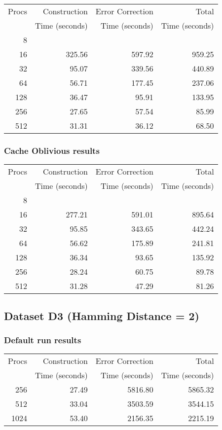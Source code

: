 \documentclass[integrals, nointegrals, article, 12pt, a4paper]{article}
\begin{document}
\begin{center}
\begin{tabular}{rrrr}
\hline
Procs & Construction & Error Correction & Total\\
 & Time (seconds) & Time (seconds) & Time (seconds)\\
\hline
8 &  &  & \\
16 & 325.56 & 597.92 & 959.25\\
32 & 95.07 & 339.56 & 440.89\\
64 & 56.71 & 177.45 & 237.06\\
128 & 36.47 & 95.91 & 133.95\\
256 & 27.65 & 57.54 & 85.99\\
512 & 31.31 & 36.12 & 68.50\\
\hline
\end{tabular}
\end{center}
\subsubsection{Cache Oblivious results}
\label{sec-2-4-3}

\begin{center}
\begin{tabular}{rrrr}
\hline
Procs & Construction & Error Correction & Total\\
 & Time (seconds) & Time (seconds) & Time (seconds)\\
\hline
8 &  &  & \\
16 & 277.21 & 591.01 & 895.64\\
32 & 95.85 & 343.65 & 442.24\\
64 & 56.62 & 175.89 & 241.81\\
128 & 36.34 & 93.65 & 135.92\\
256 & 28.24 & 60.75 & 89.78\\
512 & 31.28 & 47.29 & 81.26\\
\hline
\end{tabular}
\end{center}
\subsection{Dataset D3 (Hamming Distance = 2)}
\label{sec-2-5}
\subsubsection{Default run results}
\label{sec-2-5-1}

\begin{center}
\begin{tabular}{rrrr}
\hline
Procs & Construction & Error Correction & Total\\
 & Time (seconds) & Time (seconds) & Time (seconds)\\
\hline
256 & 27.49 & 5816.80 & 5865.32\\
512 & 33.04 & 3503.59 & 3544.15\\
1024 & 53.40 & 2156.35 & 2215.19\\
\hline
\end{tabular}
\end{center}
\end{document}
